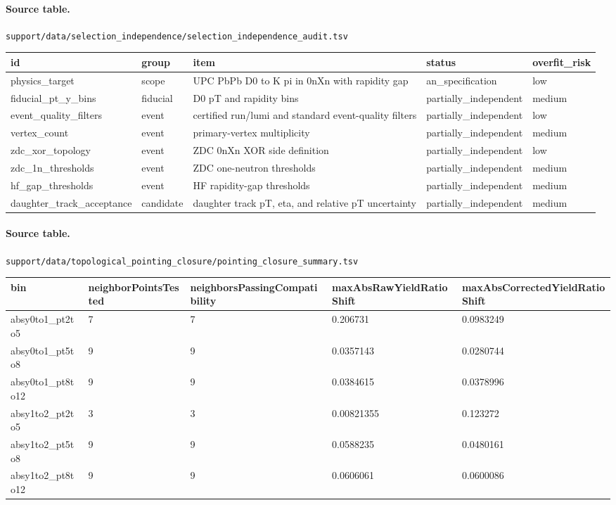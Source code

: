 \documentclass[11pt]{article}
\begin{document}
\paragraph{Source table.} \texttt{support/data/selection\_independence/selection\_independence\_audit.tsv}
\begin{center}\scriptsize
\begin{tabular}{|l|l|l|l|l|}
\hline
id & group & item & status & overfit\_risk \\ \hline
physics\_target & scope & UPC PbPb D0 to K pi in 0nXn with rapidity gap & an\_specification & low \\ \hline
fiducial\_pt\_y\_bins & fiducial & D0 pT and rapidity bins & partially\_independent & medium \\ \hline
event\_quality\_filters & event & certified run/lumi and standard event-quality filters & partially\_independent & low \\ \hline
vertex\_count & event & primary-vertex multiplicity & partially\_independent & medium \\ \hline
zdc\_xor\_topology & event & ZDC 0nXn XOR side definition & partially\_independent & low \\ \hline
zdc\_1n\_thresholds & event & ZDC one-neutron thresholds & partially\_independent & medium \\ \hline
hf\_gap\_thresholds & event & HF rapidity-gap thresholds & partially\_independent & medium \\ \hline
daughter\_track\_acceptance & candidate & daughter track pT, eta, and relative pT uncertainty & partially\_independent & medium \\ \hline
\end{tabular}
\end{center}
\paragraph{Source table.} \texttt{support/data/topological\_pointing\_closure/pointing\_closure\_summary.tsv}
\begin{center}\scriptsize
\begin{tabular}{|l|l|l|l|l|}
\hline
bin & neighborPointsTested & neighborsPassingCompatibility & maxAbsRawYieldRatioShift & maxAbsCorrectedYieldRatioShift \\ \hline
absy0to1\_pt2to5 & 7 & 7 & 0.206731 & 0.0983249 \\ \hline
absy0to1\_pt5to8 & 9 & 9 & 0.0357143 & 0.0280744 \\ \hline
absy0to1\_pt8to12 & 9 & 9 & 0.0384615 & 0.0378996 \\ \hline
absy1to2\_pt2to5 & 3 & 3 & 0.00821355 & 0.123272 \\ \hline
absy1to2\_pt5to8 & 9 & 9 & 0.0588235 & 0.0480161 \\ \hline
absy1to2\_pt8to12 & 9 & 9 & 0.0606061 & 0.0600086 \\ \hline
\end{tabular}
\end{center}
\end{document}
